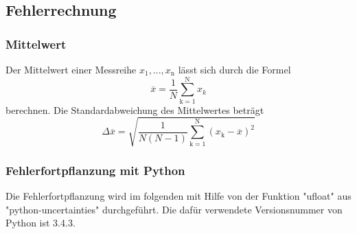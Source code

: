 \subsection{Fehlerrechnung}
\subsubsection{Mittelwert}
Der Mittelwert einer Messreihe $x_1, ... ,x_\text{n}$ lässt sich durch die Formel
\begin{equation}
	\overline{x} = \frac{1}{N} \sum_{\text{k}=1}^\text{N} x_k
	\label{eqn:ave}
\end{equation}
berechnen. Die Standardabweichung des Mittelwertes beträgt
\begin{equation}
	\Delta \overline{x} = \sqrt{ \frac{1}{N(N-1)} \sum_{\text{k}=1}^\text{N} (x_\text{k} - \overline{x})^2}
	\label{eqn:std}
\end{equation}

\subsubsection{Fehlerfortpflanzung mit Python}
Die Fehlerfortpflanzung wird im folgenden mit Hilfe von der Funktion "ufloat" aus "python-uncertainties" durchgeführt. Die dafür verwendete Versionsnummer von Python ist 3.4.3.
